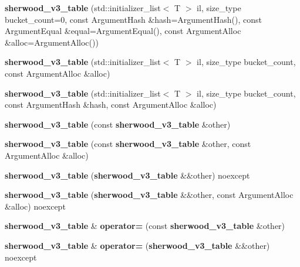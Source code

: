 \begin{DoxyCompactItemize}
\item 
{\bfseries sherwood\+\_\+v3\+\_\+table} (std\+::initializer\+\_\+list$<$ T $>$ il, size\+\_\+type bucket\+\_\+count=0, const Argument\+Hash \&hash=Argument\+Hash(), const Argument\+Equal \&equal=Argument\+Equal(), const Argument\+Alloc \&alloc=Argument\+Alloc())\label{classska_1_1detailv3_1_1sherwood__v3__table_a1e01d0f0bc2bef91111cc3725650c8b9}

\item 
{\bfseries sherwood\+\_\+v3\+\_\+table} (std\+::initializer\+\_\+list$<$ T $>$ il, size\+\_\+type bucket\+\_\+count, const Argument\+Alloc \&alloc)\label{classska_1_1detailv3_1_1sherwood__v3__table_a2b1d486b1600c22433ea307edc9439c7}

\item 
{\bfseries sherwood\+\_\+v3\+\_\+table} (std\+::initializer\+\_\+list$<$ T $>$ il, size\+\_\+type bucket\+\_\+count, const Argument\+Hash \&hash, const Argument\+Alloc \&alloc)\label{classska_1_1detailv3_1_1sherwood__v3__table_ac1274798f4e5daff51a970ce42b33208}

\item 
{\bfseries sherwood\+\_\+v3\+\_\+table} (const {\bf sherwood\+\_\+v3\+\_\+table} \&other)\label{classska_1_1detailv3_1_1sherwood__v3__table_a4ec00a345a75c7c174ce208e8a84606d}

\item 
{\bfseries sherwood\+\_\+v3\+\_\+table} (const {\bf sherwood\+\_\+v3\+\_\+table} \&other, const Argument\+Alloc \&alloc)\label{classska_1_1detailv3_1_1sherwood__v3__table_ac26c91c80f8c1fa92d1a575d63ae924f}

\item 
{\bfseries sherwood\+\_\+v3\+\_\+table} ({\bf sherwood\+\_\+v3\+\_\+table} \&\&other) noexcept\label{classska_1_1detailv3_1_1sherwood__v3__table_a97d71f431ff7b23a666995dc75d0d0bc}

\item 
{\bfseries sherwood\+\_\+v3\+\_\+table} ({\bf sherwood\+\_\+v3\+\_\+table} \&\&other, const Argument\+Alloc \&alloc) noexcept\label{classska_1_1detailv3_1_1sherwood__v3__table_aed772a8cfa891330a49369fcb681ab49}

\item 
{\bf sherwood\+\_\+v3\+\_\+table} \& {\bfseries operator=} (const {\bf sherwood\+\_\+v3\+\_\+table} \&other)\label{classska_1_1detailv3_1_1sherwood__v3__table_aab785e138889f48f453aeb56f9cb3a5f}

\item 
{\bf sherwood\+\_\+v3\+\_\+table} \& {\bfseries operator=} ({\bf sherwood\+\_\+v3\+\_\+table} \&\&other) noexcept\label{classska_1_1detailv3_1_1sherwood__v3__table_a014e26f08f8e3209e26c32b74e602556}


\end{DoxyCompactItemize}
